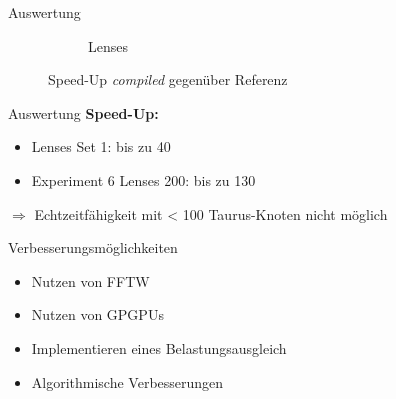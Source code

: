 \begin{frame}{Auswertung}
\begin{center}
\begin{figure}[h]
\begin{subfigure}[b]{0.45\textwidth}
				\caption{Lenses}
			\end{subfigure}
			\caption{Speed-Up \textit{compiled} gegenüber Referenz}
		\end{figure}
	\end{center}
\end{frame}

\begin{frame}{Auswertung}
	\textbf{Speed-Up:}
	\begin{itemize}
		\item Lenses Set 1: bis zu 40
		\item Experiment 6 Lenses 200: bis zu 130
	\end{itemize}
	$ \Rightarrow $ Echtzeitfähigkeit mit < 100 Taurus-Knoten nicht möglich
\end{frame}

\begin{frame}{Verbesserungsmöglichkeiten}
	\begin{itemize}
		\item Nutzen von FFTW
		\item Nutzen von GPGPUs
		\item Implementieren eines Belastungsausgleich
		\item Algorithmische Verbesserungen
	\end{itemize}
\end{frame}